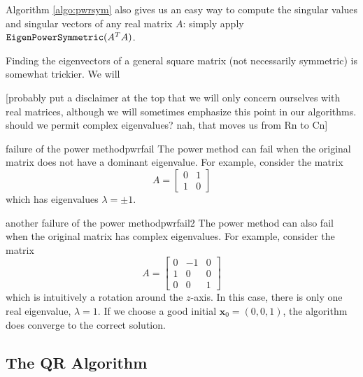 \documentclass{article}
\let\vec\mathbf
\begin{document}
Algorithm \ref{algo:pwrsym} also gives us an easy way to compute the singular values and singular vectors of any real matrix $A$: simply apply $\textrm{\texttt{EigenPowerSymmetric}}(A^TA)$.

Finding the eigenvectors of a general square matrix (not necessarily symmetric) is somewhat trickier. We will

[probably put a disclaimer at the top that we will only concern ourselves with real matrices, although we will sometimes emphasize this point in our algorithms. should we permit complex eigenvalues? nah, that moves us from Rn to Cn]

\begin{example}{failure of the power method}{pwrfail}
  The power method can fail when the original matrix does not have a dominant eigenvalue. For example, consider the matrix
  \begin{equation*}
    A = \begin{bmatrix}0 & 1 \\ 1 & 0\end{bmatrix}
  \end{equation*}
  which has eigenvalues $\lambda = \pm 1$.
\end{example}

\begin{example}{another failure of the power method}{pwrfail2}
  The power method can also fail when the original matrix has complex eigenvalues. For example, consider the matrix
  \begin{equation*}
    A = \begin{bmatrix}0 & -1 & 0 \\ 1 & 0 & 0 \\ 0 & 0 & 1\end{bmatrix}
  \end{equation*}
  which is intuitively a rotation around the $z$-axis. In this case, there is only one real eigenvalue, $\lambda=1$. If we choose a good initial $\vec{x}_0 = (0,0,1)$, the algorithm does converge to the correct solution.
\end{example}

\subsection{The QR Algorithm}
\end{document}
